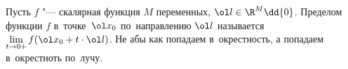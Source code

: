 
	 Пусть $f$ "--- скалярная функция $M$ переменных, $\ol l\in \R^M\dd\{0\}$. Пределом функции $f$ в~точке~$\ol x_0$ по~направлению $\ol l$ называется
	 $\lim\limits_{t\to 0+}f(\ol x_0 + t\cdot \ol l)$. Не абы как попадаем в~окрестность, а попадаем в~окрестноть по~лучу.
	 